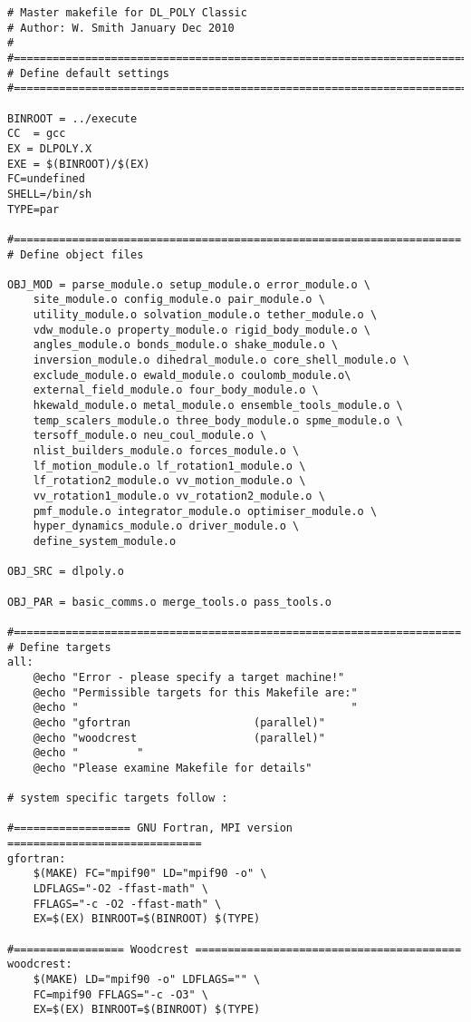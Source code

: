 
\label{A1}
\begin{verbatim}
# Master makefile for DL_POLY Classic
# Author: W. Smith January Dec 2010
# 
#=======================================================================
# Define default settings
#=======================================================================

BINROOT = ../execute
CC  = gcc
EX = DLPOLY.X
EXE = $(BINROOT)/$(EX)
FC=undefined
SHELL=/bin/sh
TYPE=par

#=====================================================================
# Define object files

OBJ_MOD = parse_module.o setup_module.o error_module.o \
	site_module.o config_module.o pair_module.o \
	utility_module.o solvation_module.o tether_module.o \
	vdw_module.o property_module.o rigid_body_module.o \
	angles_module.o bonds_module.o shake_module.o \
	inversion_module.o dihedral_module.o core_shell_module.o \
	exclude_module.o ewald_module.o coulomb_module.o\
	external_field_module.o four_body_module.o \
	hkewald_module.o metal_module.o ensemble_tools_module.o \
	temp_scalers_module.o three_body_module.o spme_module.o \
	tersoff_module.o neu_coul_module.o \
	nlist_builders_module.o forces_module.o \
	lf_motion_module.o lf_rotation1_module.o \
	lf_rotation2_module.o vv_motion_module.o \
	vv_rotation1_module.o vv_rotation2_module.o \
	pmf_module.o integrator_module.o optimiser_module.o \
	hyper_dynamics_module.o driver_module.o \
	define_system_module.o

OBJ_SRC = dlpoly.o

OBJ_PAR = basic_comms.o merge_tools.o pass_tools.o

#=====================================================================
# Define targets
all:
	@echo "Error - please specify a target machine!"
	@echo "Permissible targets for this Makefile are:"
	@echo "                                          "
	@echo "gfortran                   (parallel)"
	@echo "woodcrest                  (parallel)"
	@echo "         "
	@echo "Please examine Makefile for details"

# system specific targets follow :

#================== GNU Fortran, MPI version ==============================
gfortran:
	$(MAKE) FC="mpif90" LD="mpif90 -o" \
	LDFLAGS="-O2 -ffast-math" \
	FFLAGS="-c -O2 -ffast-math" \
	EX=$(EX) BINROOT=$(BINROOT) $(TYPE)

#================= Woodcrest =========================================
woodcrest:
	$(MAKE) LD="mpif90 -o" LDFLAGS="" \
	FC=mpif90 FFLAGS="-c -O3" \
	EX=$(EX) BINROOT=$(BINROOT) $(TYPE)


\end{verbatim}
